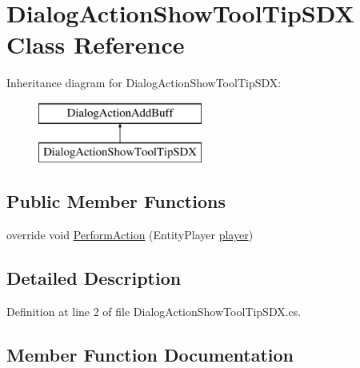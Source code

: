 \hypertarget{class_dialog_action_show_tool_tip_s_d_x}{}\section{Dialog\+Action\+Show\+Tool\+Tip\+S\+DX Class Reference}
\label{class_dialog_action_show_tool_tip_s_d_x}
Inheritance diagram for Dialog\+Action\+Show\+Tool\+Tip\+S\+DX\+:\begin{figure}[H]
\begin{center}
\leavevmode
\includegraphics[height=2.000000cm]{d5/d72/class_dialog_action_show_tool_tip_s_d_x}
\end{center}
\end{figure}
\subsection*{Public Member Functions}
\begin{DoxyCompactItemize}
\item 
override void \mbox{\hyperlink{class_dialog_action_show_tool_tip_s_d_x_aa9ff0bbc5471f3305f0d8ebf9c37e149}{Perform\+Action}} (Entity\+Player \mbox{\hyperlink{_sphere_i_i_01_music_01_boxes_2_config_2_localization_8txt_a4e2cb8aeff651600ea1cc57fe5a929a4}{player}})
\end{DoxyCompactItemize}


\subsection{Detailed Description}


Definition at line 2 of file Dialog\+Action\+Show\+Tool\+Tip\+S\+D\+X.\+cs.



\subsection{Member Function Documentation}
\mbox{\label{class_dialog_action_show_tool_tip_s_d_x_aa9ff0bbc5471f3305f0d8ebf9c37e149}} 
